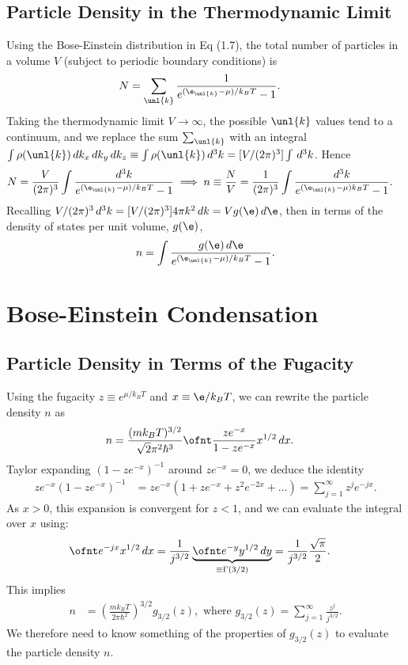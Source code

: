 \documentclass[a4paper, 11pt, normalem]{report}
\begin{document}
\section{Particle Density in the Thermodynamic Limit}
Using the Bose-Einstein distribution in Eq (1.7), the total number of particles in a volume $V$ (subject to periodic boundary conditions) is
\begin{align}
    N &= \sum_{\unl{k}}\frac{1}{e^{(\e_{\unl{k}}-\mu)/k_BT}-1}.
\end{align}
Taking the thermodynamic limit $V\to\infty$, the possible $\unl{k}$ values tend to a continuum, and we replace the sum $\sum_{\unl{k}}$ with an integral $\int\rho(\unl{k})\,dk_x\,dk_y\,dk_z \equiv \int\rho(\unl{k})\,d^3k = [V/(2\pi)^3]\int\,d^3k$.
Hence
\begin{align}
    N &= \frac{V}{(2\pi)^3}\int \frac{d^3k}{e^{(\e_{\unl{k}}-\mu)/k_BT}-1} \implies n \equiv \frac{N}{V} = \frac{1}{(2\pi)^3}\int \frac{d^3k}{e^{(\e_{\unl{k}}-\mu)k_BT}-1}.
\end{align}
Recalling $V/(2\pi)^3\,d^3k = [V/(2\pi)^3]4\pi k^2\,dk = Vg(\e)\,d\e$, then in terms of the density of states per unit volume, $g(\e)$,
\begin{align}
    n = \int \frac{g(\e)\,d\e}{e^{(\e_{\unl{k}}-\mu)/k_BT}-1}.
\end{align}

\chapter{Bose-Einstein Condensation}
\section{Particle Density in Terms of the Fugacity}
Using the fugacity $z\equiv e^{\mu/k_BT}$ and $x\equiv \e/k_BT$, we can rewrite the particle density $n$ as
\begin{align}
    n &= \frac{(mk_BT)^{3/2}}{\sqrt{2}\pi^2\hbar^3}\ofnt \frac{ze^{-x}}{1-ze^{-x}}x^{1/2}\,dx.
\end{align}
Taylor expanding $(1-ze^{-x})^{-1}$ around $ze^{-x}=0$, we deduce the identity
\begin{align}
    ze^{-x}(1-ze^{-x})^{-1} &= ze^{-x}\left(1+ze^{-x}+z^2e^{-2x} + \dots\right) = \sum_{j=1}^\infty z^je^{-jx}.
\end{align}
As $x>0$, this expansion is convergent for $z<1$, and we can evaluate the integral over $x$ using:
\begin{align}
    \ofnt e^{-jx}x^{1/2}\,dx &= \frac{1}{j^{3/2}}\underbrace{\ofnt e^{-y}y^{1/2}\,dy}_{\equiv \Gamma(3/2)} = \frac{1}{j^{3/2}}\frac{\sqrt{\pi}}{2}.
\end{align}
This implies
\begin{align}
    n &= \left(\frac{mk_BT}{2\pi\hbar^2}\right)^{3/2}g_{3/2}(z), \text{ where } g_{3/2}(z) = \sum_{j=1}^\infty \frac{z^j}{j^{3/2}}.
\end{align}
We therefore need to know something of the properties of $g_{3/2}(z)$ to evaluate the particle density $n$.
\end{document}
